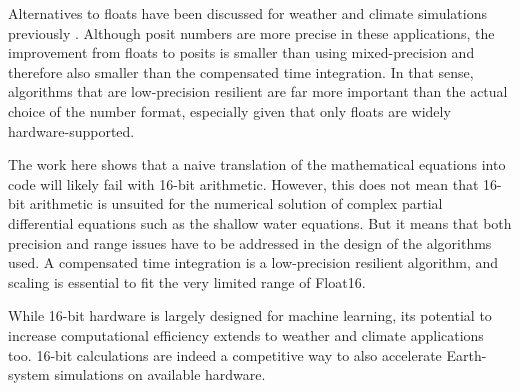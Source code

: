 Alternatives to floats have been discussed for weather and climate simulations previously \citep{Klower2019a,Klower2020b}.
Although posit numbers \citep{Gustafson2017a} are more precise in these applications, the improvement from floats to
posits is smaller than using mixed-precision and therefore also smaller than the compensated time integration.
In that sense, algorithms that are low-precision resilient are far more important than the actual choice of the
number format, especially given that only floats are widely hardware-supported.

The work here shows that a naive translation of the mathematical equations into code will likely fail with 16-bit arithmetic.
However, this does not mean that 16-bit arithmetic is unsuited for the numerical solution of complex partial differential
equations such as the shallow water equations. But it means that both precision and range issues have to be addressed
in the design of the algorithms used. A compensated time integration is a low-precision resilient algorithm,
and scaling is essential to fit the very limited range of Float16. 

While 16-bit hardware is largely designed for machine learning, its potential to increase computational efficiency
extends to weather and climate applications too. 16-bit calculations are indeed a competitive way to also accelerate
Earth-system simulations on available hardware.

